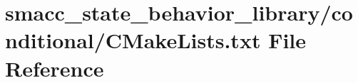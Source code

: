 \hypertarget{state__behavior__library_2conditional_2CMakeLists_8txt}{}\section{smacc\+\_\+state\+\_\+behavior\+\_\+library/conditional/\+C\+Make\+Lists.txt File Reference}
\label{state__behavior__library_2conditional_2CMakeLists_8txt}
